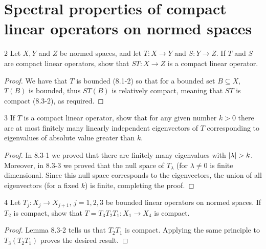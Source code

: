 \section{Spectral properties of compact linear operators on normed spaces}


\begin{exercise}{2}
Let $X, Y$ and $Z$ be normed spaces, and let $T: X \to Y$ and $S: Y \to Z$.
If $T$ and $S$ are compact linear operators, show that $S T: X \to Z$ is a compact linear operator.
\end{exercise}
\begin{proof}
We have that $T$ is bounded (8.1-2) so that for a bounded set $B \subseteq X$, $T(B)$ is bounded, thus $S T(B)$ is relatively compact, meaning that $S T$ is compact (8.3-2), as required.
\end{proof} 

\begin{exercise}{3}
If $T$ is a compact linear operator, show that for any given number $k > 0$ there are at most finitely many linearly independent eigenvectors of $T$ corresponding to eigenvalues of absolute value greater than $k$.
\end{exercise}
\begin{proof}
In 8.3-1 we proved that there are finitely many eigenvalues with $\left\lvert \lambda\right\rvert > k$.
Moreover, in 8.3-3 we proved that the null space of $T_\lambda$ (for $\lambda \neq 0$ is finite dimensional.
Since this null space corresponds to the eigenvectors, the union of all eigenvectors (for a fixed $k$) is finite, completing the proof.
\end{proof} 

\begin{exercise}{4}
Let $T_j: X_j \to X_{j+1}$, $j = 1, 2, 3$ be bounded linear operators on normed spaces.
If $T_2$ is compact, show that $T = T_3 T_2 T_1: X_1 \to X_4$ is compact.
\end{exercise}
\begin{proof}
Lemma 8.3-2 tells us that $T_2 T_1$ is compact.
Applying the same principle to $T_3 (T_2 T_1)$ proves the desired result.
\end{proof} 

